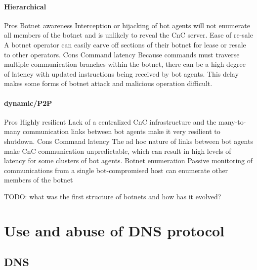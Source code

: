\paragraph{Hierarchical}
    Pros 
  Botnet awareness
Interception or hijacking of bot agents
will not enumerate all members of the
botnet and is unlikely to reveal the CnC
server.
  Ease of re-sale
A botnet operator can easily carve off
sections of their botnet for lease or resale
to other operators.
    Cons
  Command latency
Because commands must traverse
multiple communication branches within
the botnet, there can be a high degree of
latency with updated instructions being
received by bot agents. This delay makes
some forms of botnet attack and
malicious operation difficult.

\paragraph{dynamic/P2P}
    Pros 
  Highly resilient
Lack of a centralized CnC infrastructure
and the many-to-many communication
links between bot agents make it very
resilient to shutdown.
    Cons
  Command latency
The ad hoc nature of links between bot
agents make CnC communication
unpredictable, which can result in high
levels of latency for some clusters of bot
agents.
  Botnet enumeration
Passive monitoring of communications
from a single bot-compromised host can
enumerate other members of the botnet


TODO: what was the first structure of botnets and how has it evolved?



\section{Use and abuse of DNS protocol}
\subsection{DNS}


